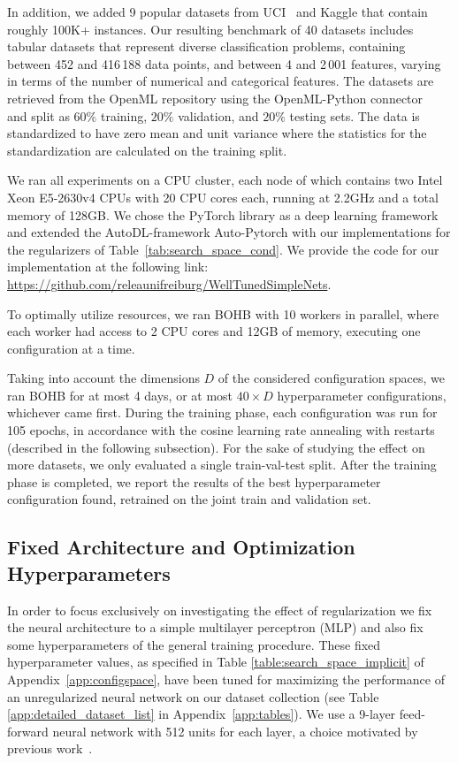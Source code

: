 In addition, we added 9 popular datasets from UCI~\citep{asuncion2007uci} and Kaggle that contain roughly 100K+ instances. Our resulting benchmark of 40 datasets includes tabular datasets that represent diverse classification problems, containing between 452 and 416\,188 data points, and between 4 and 2\,001 features, varying in terms of the number of numerical and categorical features. The datasets are retrieved from the OpenML repository \citep{vanschoren2014openml} using the OpenML-Python connector~\cite{feurer2021openml} and split as $60\%$ training, $20\%$ validation, and $20\%$ testing  sets. The data is standardized to have zero mean and unit variance where the statistics for the standardization are calculated on the training split.

We ran all experiments on a CPU cluster, each node of which contains two Intel Xeon E5-2630v4 CPUs with 20 CPU cores each, running at 2.2GHz and a total memory of 128GB. We chose the PyTorch library \citep{paszke2019pytorch} as a deep learning framework and extended the AutoDL-framework Auto-Pytorch \citep{mendoza-automlbook18a,DBLP:journals/corr/abs-2006-13799} with our implementations for the regularizers of Table~\ref{tab:search_space_cond}. We provide the code for our implementation at the following link: \url{https://github.com/releaunifreiburg/WellTunedSimpleNets}.

To optimally utilize resources, we ran BOHB with 10 workers in parallel, where each worker had access to 2 CPU cores and 12GB of memory, executing one configuration at a time. 

Taking into account the dimensions $D$ of the considered configuration spaces, we ran BOHB for at most 4 days, or at most $40\times D$ hyperparameter configurations, whichever came first. During the training phase, each configuration was run for 105 epochs, in accordance with the cosine learning rate annealing with restarts (described in the following subsection). For the sake of studying the effect on more datasets, we only evaluated a single train-val-test split. After the training phase is completed, we report the results of the best hyperparameter configuration found, retrained on the joint train and validation set.

\subsection{Fixed Architecture and Optimization Hyperparameters}
\label{sec:fixhp}

In order to focus exclusively on investigating the effect of regularization we fix the neural architecture to a simple multilayer perceptron (MLP) and also fix some hyperparameters of the general training procedure. These fixed hyperparameter values, as specified in Table \ref{table:search_space_implicit} of Appendix~\ref{app:configspace}, have been tuned for maximizing the performance of an unregularized neural network on our dataset collection (see Table \ref{app:detailed_dataset_list} in Appendix~\ref{app:tables}). We use a 9-layer feed-forward neural network with 512 units for each layer, a choice motivated by previous work~\citep{orhan2017skip}.

